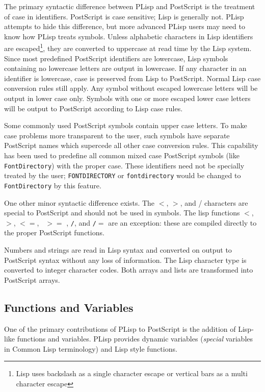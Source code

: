 The primary syntactic difference between PLisp and PostScript is the treatment
of case in identifiers.  PostScript is case sensitive; Lisp is
generally not.
PLisp attempts to hide this difference, but
more advanced PLisp users may need to know how PLisp treats symbols.
Unless alphabetic characters in Lisp identifiers are escaped\footnote{Lisp
uses 
backslash
as a single character escape or
vertical bars
as a multi character escape}, they are
converted to uppercase at read time by the Lisp system.
Since most predefined PostScript identifiers are lowercase, Lisp
symbols containing no lowercase letters are output in lowercase.  If any
character in an identifier is lowercase, case is preserved from Lisp
to PostScript.  Normal Lisp case conversion rules still apply.  Any
symbol without escaped lowercase letters
will be output in lower case only.  Symbols with one or more escaped
lower case letters 
will be output to PostScript according to Lisp case rules.

Some commonly used PostScript symbols contain upper case letters.
To make case problems more transparent to the user,  such symbols have
separate PostScript names which supercede all other case conversion
rules.  This capability has been  
used to predefine all common mixed case PostScript symbols (like
{\tt FontDirectory}) 
with the proper case.  These identifiers need not be specially treated
by the user; {\tt FONTDIRECTORY} or {\tt fontdirectory} would be changed to
{\tt FontDirectory} by this feature.

One other minor syntactic difference exists.  The $<$, $>$, and /
characters are special to PostScript and should not be used in
symbols.  The lisp functions {\tt $<$}, {\tt $>$}, {\tt $<=$}, {\tt
$>=$} , {\tt /}, and {\tt /$=$}
are an exception: these
are compiled directly to the proper PostScript functions.

Numbers and strings are read in Lisp syntax and converted on output to
PostScript syntax without any loss of information.  The Lisp character type
is converted to integer character codes.  Both arrays and lists are 
transformed into PostScript arrays.

\subsection{Functions and Variables}

One of the primary contributions of PLisp to PostScript is the addition of
Lisp-like
functions and variables.  PLisp provides dynamic variables 
({\it special} variables in Common Lisp terminology) and Lisp
style functions.

